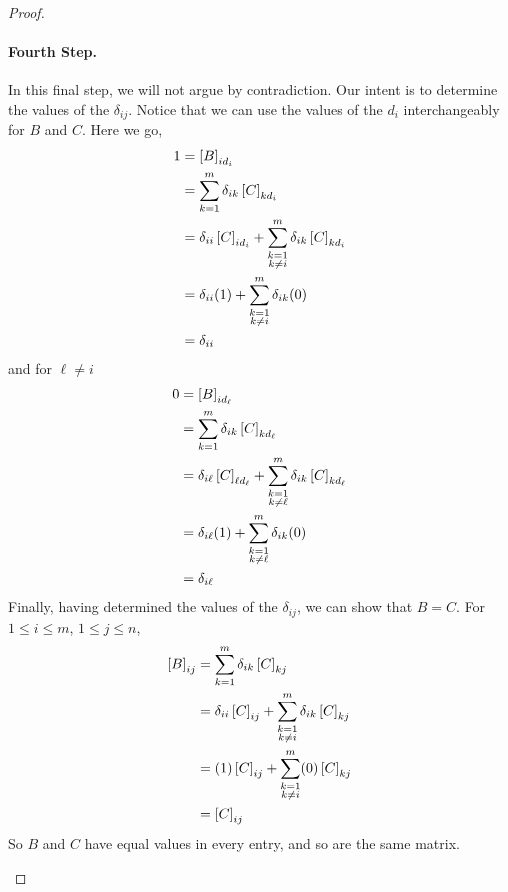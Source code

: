 \documentclass{ximera}
\begin{document}
\begin{theorem}
\begin{proof}
\begin{expandable}
\paragraph*{Fourth Step.}  In this final step, we will not argue by contradiction.  Our intent is to determine the values of the $\delta_{ij}$.  Notice that we can use the values of the $d_i$ interchangeably for $B$ and $C$.  Here we go,
\begin{align*}
1
&=\left\lbrack B\right\rbrack_{id_i}
\\
&=\sum_{k=1}^{m}\delta_{ik}\left\lbrack C\right\rbrack_{kd_i}\\
&=
\delta_{ii}\left\lbrack C\right\rbrack_{id_i}
+
\sum_{\substack{k=1\\k\neq i}}^{m}\delta_{ik}\left\lbrack C\right\rbrack_{kd_i}
\\
&=
\delta_{ii}(1)
+
\sum_{\substack{k=1\\k\neq i}}^{m}\delta_{ik}(0)
\\
&=\delta_{ii}
\end{align*}
and for $\ell\neq i$
\begin{align*}
0
&=\left\lbrack B\right\rbrack_{id_\ell}
\\
&=\sum_{k=1}^{m}\delta_{ik}\left\lbrack C\right\rbrack_{kd_\ell}\\
&=
\delta_{i\ell}\left\lbrack C\right\rbrack_{\ell d_\ell}
+
\sum_{\substack{k=1\\k\neq\ell}}^{m}\delta_{ik}\left\lbrack C\right\rbrack_{kd_\ell}
\\
&=
\delta_{i\ell}(1)
+
\sum_{\substack{k=1\\k\neq\ell}}^{m}\delta_{ik}(0)
\\
&=\delta_{i\ell}
\end{align*}
Finally, having determined the values of the $\delta_{ij}$, we can show that $B=C$.  For $1\leq i\leq m$, $1\leq j\leq n$,
\begin{align*}
\left\lbrack B\right\rbrack_{ij}
&=\sum_{k=1}^{m}\delta_{ik}\left\lbrack C\right\rbrack_{kj}\\
&=
\delta_{ii}\left\lbrack C\right\rbrack_{ij}
+
\sum_{\substack{k=1\\k\neq i}}^{m}\delta_{ik}\left\lbrack C\right\rbrack_{kj}
\\
&=
(1)\left\lbrack C\right\rbrack_{ij}
+
\sum_{\substack{k=1\\k\neq i}}^{m}(0)\left\lbrack C\right\rbrack_{kj}\\
&=\left\lbrack C\right\rbrack_{ij}
\end{align*}
So $B$ and $C$ have equal values in every entry, and so are the same matrix.
\end{expandable}
\end{proof}
\end{theorem}
\end{document}
